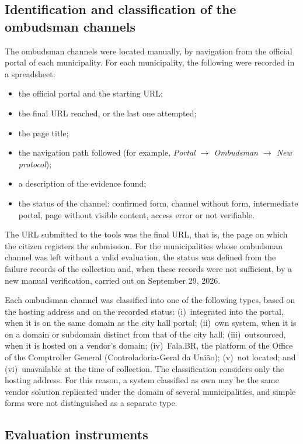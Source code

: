 \documentclass[12pt]{article}
\begin{document}
\subsection{Identification and classification of the ombudsman channels}

The ombudsman channels were located manually, by navigation from the official portal of each municipality. For each municipality, the following were recorded in a spreadsheet:
\begin{itemize}
  \item the official portal and the starting URL;
  \item the final URL reached, or the last one attempted;
  \item the page title;
  \item the navigation path followed (for example, \textit{Portal $\rightarrow$ Ombudsman $\rightarrow$ New protocol});
  \item a description of the evidence found;
  \item the status of the channel: confirmed form, channel without form, intermediate portal, page without visible content, access error or not verifiable.
\end{itemize}
The URL submitted to the tools was the final URL, that is, the page on which the citizen registers the submission. For the municipalities whose ombudsman channel was left without a valid evaluation, the status was defined from the failure records of the collection and, when these records were not sufficient, by a new manual verification, carried out on September 29, 2026.

Each ombudsman channel was classified into one of the following types, based on the hosting address and on the recorded status:
(i)~integrated into the portal, when it is on the same domain as the city hall portal;
(ii)~own system, when it is on a domain or subdomain distinct from that of the city hall;
(iii)~outsourced, when it is hosted on a vendor's domain;
(iv)~Fala.BR, the platform of the Office of the Comptroller General (Controladoria-Geral da União);
(v)~not located; and
(vi)~unavailable at the time of collection.
The classification considers only the hosting address. For this reason, a system classified as own may be the same vendor solution replicated under the domain of several municipalities, and simple forms were not distinguished as a separate type.

\subsection{Evaluation instruments}
\end{document}
